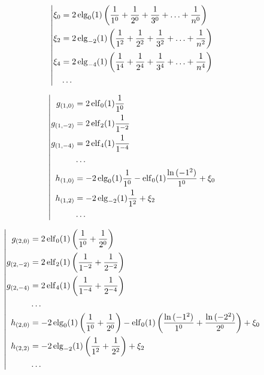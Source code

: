 \begin{equation*} \left| \begin{aligned}
\xi_0 &= 2 \elg_0(1) \left(
  \frac{1}{1^0}
+ \frac{1}{2^0}
+ \frac{1}{3^0}
+ \ldots
+ \frac{1}{n^0} \right) \\
%
\xi_2 &= 2 \elg_{-2}(1) \left(
  \frac{1}{1^2}
+ \frac{1}{2^2}
+ \frac{1}{3^2}
+ \ldots
+ \frac{1}{n^2} \right) \\
%
\xi_4 &= 2 \elg_{-4}(1) \left(
  \frac{1}{1^4}
+ \frac{1}{2^4}
+ \frac{1}{3^4}
+ \ldots
+ \frac{1}{n^4} \right) \\
%
&\ldots \\
\end{aligned} \right. \end{equation*}

\begin{equation*} \left| \begin{aligned}
g_{(1,0)} &=
  2 \elf_0(1) \frac{1}{1^0} \\
%
g_{(1,-2)} &=
  2 \elf_2(1) \frac{1}{1^{-2}} \\
%
g_{(1,-4)} &=
  2 \elf_4(1) \frac{1}{1^{-4}} \\
%
&\ldots \\
%
h_{(1,0)} &=
- 2 \elg_0(1) \frac{1}{1^0}
- \elf_0(1) \frac{\ln{(-1^2)}}{1^0}
+ \xi_0 \\
%
h_{(1,2)} &=
- 2 \elg_{-2}(1) \frac{1}{1^2}
+ \xi_2 \\
%
&\ldots \\
\end{aligned} \right. \end{equation*}

\begin{equation*} \left| \begin{aligned}
g_{(2,0)} &=
  2 \elf_0(1) \left(
  \frac{1}{1^0}
+ \frac{1}{2^0} \right) \\
%
g_{(2,-2)} &=
  2 \elf_2(1) \left(
  \frac{1}{1^{-2}}
+ \frac{1}{2^{-2}} \right) \\
%
g_{(2,-4)} &=
  2 \elf_4(1) \left(
  \frac{1}{1^{-4}}
+ \frac{1}{2^{-4}} \right) \\
%
&\ldots \\
%
h_{(2,0)} &=
- 2 \elg_0(1) \left(
  \frac{1}{1^0}
+ \frac{1}{2^0} \right)
- \elf_0(1) \left(
  \frac{\ln{(-1^2)}}{1^0}
+ \frac{\ln{(-2^2)}}{2^0} \right)
+ \xi_0 \\
%
h_{(2,2)} &=
- 2 \elg_{-2}(1) \left(
  \frac{1}{1^2}
+ \frac{1}{2^2} \right)
+ \xi_2 \\
%
&\ldots \\
\end{aligned} \right. \end{equation*}

